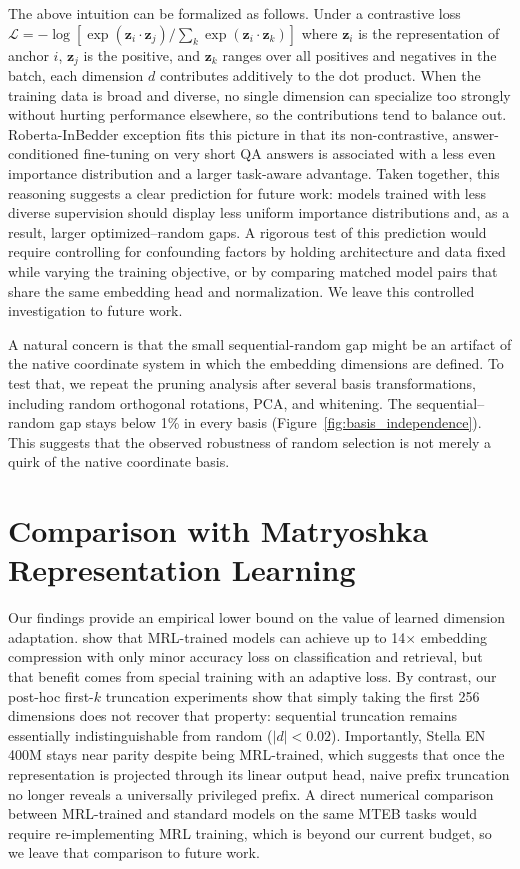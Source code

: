 \documentclass[11pt,a4paper]{article}
\begin{document}
The above intuition can be formalized as follows. Under a contrastive loss $\mathcal{L} = -\log[\exp(\mathbf{z}_i \cdot \mathbf{z}_j) / \sum_{k} \exp(\mathbf{z}_i \cdot \mathbf{z}_k)]$ where $\mathbf{z}_i$ is the representation of anchor $i$, $\mathbf{z}_j$ is the positive, and $\mathbf{z}_k$ ranges over all positives and negatives in the batch, each dimension $d$ contributes additively to the dot product. When the training data is broad and diverse, no single dimension can specialize too strongly without hurting performance elsewhere, so the contributions tend to balance out. Roberta-InBedder exception fits this picture in that its non-contrastive, answer-conditioned fine-tuning on very short QA answers is associated with a less even importance distribution and a larger task-aware advantage. Taken together, this reasoning suggests a clear prediction for future work: models trained with less diverse supervision should display less uniform importance distributions and, as a result, larger optimized–random gaps. A rigorous test of this prediction would require controlling for confounding factors by holding architecture and data fixed while varying the training objective, or by comparing matched model pairs that share the same embedding head and normalization. We leave this controlled investigation to future work.

A natural concern is that the small sequential-random gap might be an artifact of the native coordinate system in which the embedding dimensions are defined. To test that, we repeat the pruning analysis after several basis transformations, including random orthogonal rotations, PCA, and whitening. The sequential--random gap stays below 1\% in every basis (Figure~\ref{fig:basis_independence}). This suggests that the observed robustness of random selection is not merely a quirk of the native coordinate basis.

\section{Comparison with Matryoshka Representation Learning}
\label{sec:matryoshka_comparison}
Our findings provide an empirical lower bound on the value of learned dimension adaptation. \citet{matryoshka2023} show that MRL-trained models can achieve up to 14$\times$ embedding compression with only minor accuracy loss on classification and retrieval, but that benefit comes from special training with an adaptive loss. By contrast, our post-hoc first-$k$ truncation experiments show that simply taking the first 256 dimensions does not recover that property: sequential truncation remains essentially indistinguishable from random ($|d| < 0.02$). Importantly, Stella EN 400M stays near parity despite being MRL-trained, which suggests that once the representation is projected through its linear output head, naive prefix truncation no longer reveals a universally privileged prefix. A direct numerical comparison between MRL-trained and standard models on the same MTEB tasks would require re-implementing MRL training, which is beyond our current budget, so we leave that comparison to future work.
\end{document}
